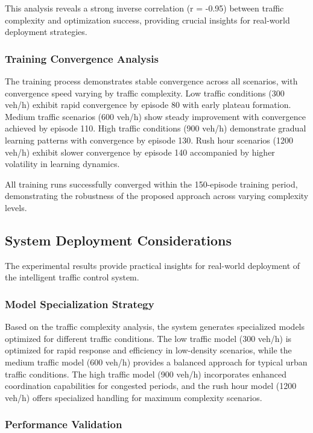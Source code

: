 This analysis reveals a strong inverse correlation (r = -0.95) between traffic complexity and 
optimization success, providing crucial insights for real-world deployment strategies.

\subsubsection{Training Convergence Analysis}

The training process demonstrates stable convergence across all scenarios, with convergence speed 
varying by traffic complexity. Low traffic conditions (300 veh/h) exhibit rapid convergence by 
episode 80 with early plateau formation. Medium traffic scenarios (600 veh/h) show steady improvement 
with convergence achieved by episode 110. High traffic conditions (900 veh/h) demonstrate gradual 
learning patterns with convergence by episode 130. Rush hour scenarios (1200 veh/h) exhibit slower 
convergence by episode 140 accompanied by higher volatility in learning dynamics.

All training runs successfully converged within the 150-episode training period, demonstrating the 
robustness of the proposed approach across varying complexity levels.

\subsection{System Deployment Considerations}\label{subsec2b-5}

The experimental results provide practical insights for real-world deployment of the intelligent 
traffic control system.

\subsubsection{Model Specialization Strategy}

Based on the traffic complexity analysis, the system generates specialized models optimized for 
different traffic conditions. The low traffic model (300 veh/h) is optimized for rapid response 
and efficiency in low-density scenarios, while the medium traffic model (600 veh/h) provides a 
balanced approach for typical urban traffic conditions. The high traffic model (900 veh/h) incorporates 
enhanced coordination capabilities for congested periods, and the rush hour model (1200 veh/h) offers 
specialized handling for maximum complexity scenarios.

\subsubsection{Performance Validation}

